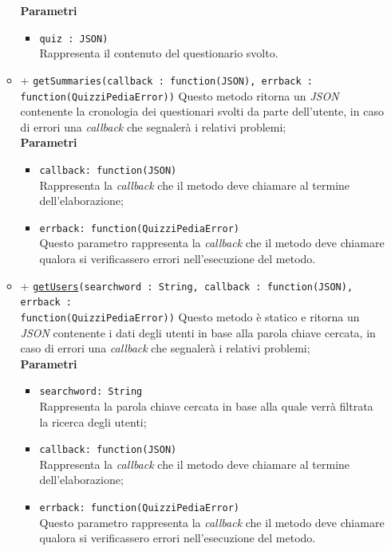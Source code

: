 \begin{itemize}
\begin{itemize}
		\textbf{Parametri} 
			\begin{itemize}
			\item	
				\texttt{quiz : JSON)} \\
				Rappresenta il contenuto del questionario svolto.		
			\end{itemize}
		\item	
		+ \texttt{getSummaries(callback : function(JSON), errback : function(QuizziPediaError))}	
		Questo metodo ritorna un \textit{JSON} contenente la cronologia dei questionari svolti da parte dell'utente, in caso di errori una \textit{callback} che segnalerà i relativi problemi;\\
		\textbf{Parametri} 
			\begin{itemize}
			\item	
				\texttt{callback: function(JSON)} \\
				Rappresenta la \textit{callback} che il metodo deve chiamare al termine dell'elaborazione;	
			\item	
				\texttt{errback: function(QuizziPediaError)} \\
				Questo parametro rappresenta la \textit{callback} che il metodo deve chiamare qualora si verificassero errori nell'esecuzione del metodo.
			\end{itemize}	
		\item			
		+ \texttt{\underline{getUsers}(searchword : String, callback : function(JSON), errback : \\function(QuizziPediaError))}		
		Questo metodo è statico e ritorna un \textit{JSON} contenente i dati degli utenti in base alla parola chiave cercata, in caso di errori una \textit{callback} che segnalerà i relativi problemi;\\
		\textbf{Parametri} 
			\begin{itemize}
			\item	
				\texttt{searchword: String} \\
				Rappresenta la parola chiave cercata in base alla quale verrà filtrata la ricerca degli utenti;	
			\item	
				\texttt{callback: function(JSON)} \\
				Rappresenta la \textit{callback} che il metodo deve chiamare al termine dell'elaborazione;	
			\item	
				\texttt{errback: function(QuizziPediaError)} \\
				Questo parametro rappresenta la \textit{callback} che il metodo deve chiamare qualora si verificassero errori nell'esecuzione del metodo.		
			\end{itemize}
		\end{itemize}	
\end{itemize}